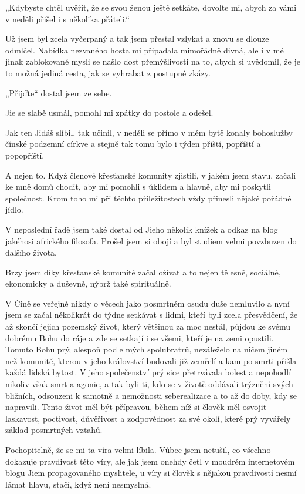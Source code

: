 „Kdybyste chtěl uvěřit, že se svou ženou ještě setkáte, dovolte mi, abych za vámi v neděli přišel i s několika přáteli.“

Už jsem byl zcela vyčerpaný a tak jsem přestal vzlykat a znovu se dlouze odmlčel. Nabídka nezvaného hosta mi připadala mimořádně divná, ale i v mé jinak zablokované mysli se našlo dost přemýšlivosti na to, abych si uvědomil, že je to možná jediná cesta, jak se vyhrabat z postupné zkázy.

„Přijďte“ dostal jsem ze sebe.

Jie se slabě usmál, pomohl mi zpátky do postole a odešel.
\vspace{0.75cm}

Jak ten Jidáš slíbil, tak učinil, v neděli se přímo v mém bytě konaly bohoslužby čínské podzemní církve a stejně tak tomu bylo i týden příští, popříští a popopříští.

A nejen to. Když členové křesťanské komunity zjistili, v jakém jsem stavu, začali ke mně domů chodit, aby mi pomohli s úklidem a hlavně, aby mi poskytli společnost. Krom toho mi při těchto příležitostech vždy přinesli nějaké pořádné jídlo.

V neposlední řadě jsem také dostal od Jieho několik knížek a odkaz na blog jakéhosi afrického filosofa. Prošel jsem si obojí a byl studiem velmi povzbuzen do dalšího života.

Brzy jsem díky křesťanské komunitě začal ožívat a to nejen tělesně, sociálně, ekonomicky a duševně, nýbrž také spirituálně.

V Číně se veřejně nikdy o věcech jako posmrtném osudu duše nemluvilo a nyní jsem se začal několikrát do týdne setkávat s lidmi, kteří byli zcela přesvědčení, že až skončí jejich pozemský život, který většinou za moc nestál, půjdou ke svému dobrému Bohu do ráje a zde se setkají i se všemi, kteří je na zemi opustili. Tomuto Bohu prý, alespoň podle mých spolubratrů, nezáleželo na ničem jiném než komunitě, kterou v jeho království budovali již zemřelí a kam po smrti přišla každá lidská bytost. V jeho společenství prý sice přetrvávala bolest a nepohodlí nikoliv však smrt a agonie, a tak byli ti, kdo se v životě oddávali trýznění svých bližních, odsouzeni k samotně a nemožnosti seberealizace a to až do doby, kdy se napravili. Tento život měl být přípravou, během níž si člověk měl osvojit laskavost, poctivost, důvěřivost a zodpovědnost za své okolí, které prý vyvářely základ posmrtných vztahů. 

Pochopitelně, že se mi ta víra velmi líbila. Vůbec jsem netušil, co všechno dokazuje pravdivost této víry, ale jak jsem onehdy četl v moudrém internetovém blogu Jiem propagovaného myslitele, u víry si člověk s nějakou pravdivostí nesmí lámat hlavu, stačí, když není nesmyslná. 
\vspace{0.75cm}

